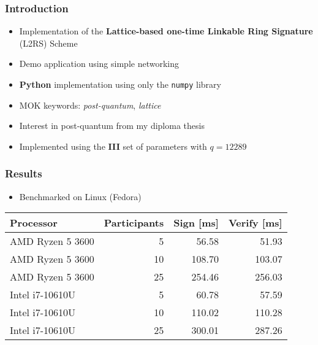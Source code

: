\documentclass[%
  14pt,       				%
	t,                  %
	aspectratio=1610,   %
	unicode,						%
]{beamer}				    	%
\begin{document}
\disablenavigationsymbols

\maketitle

 
\begin{frame}[c]
	\frametitle{Introduction}
	\large{
		\begin{itemize}
			\item Implementation of the \textbf{Lattice-based one-time Linkable Ring Signature} (L2RS) Scheme
			\item Demo application using simple networking
			\item \textbf{Python} implementation using only the \texttt{numpy} library
			\item MOK keywords: \textit{post-quantum}, \textit{lattice}
			\item Interest in post-quantum from my diploma thesis
			\item Implemented using the \textbf{III} set of parameters with $q=12289$
		\end{itemize}
	}
\end{frame}


\begin{frame}[c]
	\frametitle{Results}
	\large{
		\begin{itemize}
			\item Benchmarked on Linux (Fedora)
		\end{itemize}
	}
	\begin{table}[htbp]
		\centering
		\begin{tabular}{|l|r|r|r|}
			\hline
			Processor        & Participants & Sign [ms] & Verify [ms] \\
			\hline
			AMD Ryzen 5 3600 & 5            & 56.58     & 51.93       \\
			AMD Ryzen 5 3600 & 10           & 108.70    & 103.07      \\
			AMD Ryzen 5 3600 & 25           & 254.46    & 256.03      \\
			Intel i7-10610U  & 5            & 60.78     & 57.59       \\
			Intel i7-10610U  & 10           & 110.02    & 110.28      \\
			Intel i7-10610U  & 25           & 300.01    & 287.26      \\
			\hline
		\end{tabular}
	\end{table}
\end{frame}
\end{document}
